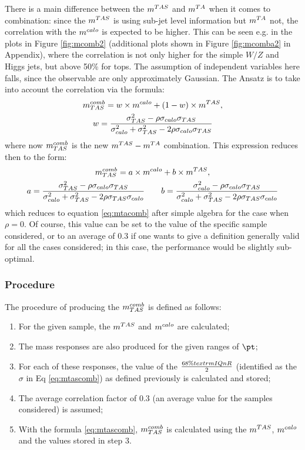 There is a main difference between the $m^{TAS}$ and $m^{TA}$ when it comes to combination: since the $m^{TAS}$ is using sub-jet level information but $m^{TA}$ not, the correlation with the $m^{calo}$ is expected to be higher.
This can be seen e.g. in the plots in Figure \ref{fig:mcomb2} (additional plots shown in Figure \ref{fig:mcomba2} in Appendix), where the correlation is not only higher for the simple $W/Z$ and Higgs jets, but above 50\% for tops. The assumption of independent variables here falls, since the observable are only approximately Gaussian. The Ansatz is to take into account the correlation via the formula:
\begin{equation}
\begin{gathered}
m^{comb}_{TAS}= w\times m^{calo} + (1-w)\times m^{TAS},\\
w=\frac{\sigma_{TAS}^2-\rho\sigma_{calo}\sigma_{TAS}}{\sigma_{calo}^2+\sigma_{TAS}^2-2\rho\sigma_{calo}\sigma_{TAS}}
\end{gathered}
\label{eq:mtascomb}
\end{equation}
% 
where now $m^{comb}_{TAS}$ is the new $m^{TAS}-m^{TA}$ combination. This expression reduces then to the form:
\begin{equation}
\begin{gathered}
m^{comb}_{TAS}= a\times m^{calo} + b\times m^{TAS},\\
a=\frac{\sigma_{TAS}^2-\rho\sigma_{calo}\sigma_{TAS}}{\sigma_{calo}^2+\sigma_{TAS}^2-2\rho\sigma_{TAS}\sigma_{calo}}\qquad b=\frac{\sigma_{calo}^2-\rho\sigma_{calo}\sigma_{TAS}}{\sigma_{calo}^2+\sigma_{TAS}^2-2\rho\sigma_{TAS}\sigma_{calo}}
\end{gathered}
\end{equation}
which reduces to equation \eqref{eq:mtacomb} after simple algebra for the case when $\rho=0$. Of course, this value can be set to the value of the specific sample considered, or to an average of 0.3 if one wants to give a definition generally valid for all the cases considered; in this case, the performance would be slightly sub-optimal.

\subsubsection{Procedure}
The procedure of producing the $m^{comb}_{TAS}$ is defined as follows:
\begin{enumerate}
 \item For the given sample, the $m^{TAS}$ and $m^{calo}$ are calculated;
 \item The mass responses are also produced for the given ranges of $\pt$;
 \item For each of these responses, the value of the $\frac{68\% \:\\textrm{IQnR}}{2}$ (identified as the $\sigma$ in Eq \ref{eq:mtascomb}) as defined previously is calculated and stored;
 \item The average correlation factor of 0.3 (an average value for the samples considered) is assumed;
 \item With the formula \ref{eq:mtascomb}, $m^{comb}_{TAS}$ is calculated using the $m^{TAS}$, $m^{calo}$ and the values stored in step 3.
\end{enumerate}

